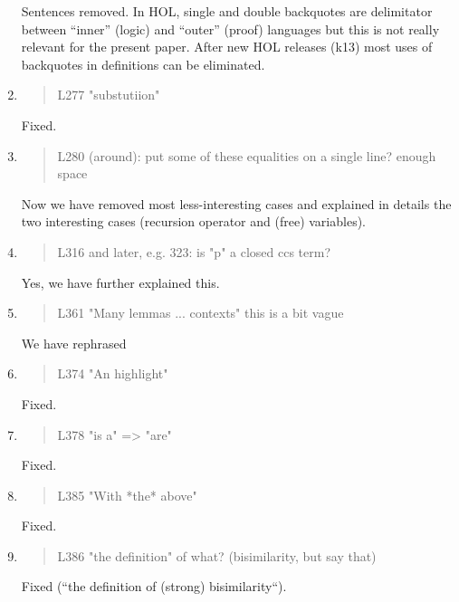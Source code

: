 \begin{enumerate}
  \Mark
  Sentences removed. In HOL, single and double backquotes are
  delimitator between ``inner'' (logic) and ``outer'' (proof)
  languages but this is not really  relevant for the present paper.
  After new HOL releases (k13) most uses of backquotes in  definitions can be eliminated.
  
\item \begin{quote}
    L277 "substutiion"
  \end{quote}
  \Mark
  Fixed.
  
\item \begin{quote}
    L280 (around): put some of these equalities on a single line? enough space
  \end{quote}
  \Mark
  Now we have removed most less-interesting cases and explained in
  details the two interesting cases (recursion operator and (free) variables).
  
\item \begin{quote}
    L316 and later, e.g. 323: is "p" a closed ccs term?
  \end{quote}

  \Mark
  Yes, we have further explained this.

\item \begin{quote}
    L361 "Many lemmas ... contexts" this is a bit vague
  \end{quote}

  \Mark
 We have rephrased
  
\item \begin{quote}
    L374 "An highlight"
  \end{quote}
   \Mark
 Fixed.  %
  
\item \begin{quote}
    L378 "is a" => "are"
  \end{quote}
  \Mark
  Fixed.  
  
\item \begin{quote}
    L385 "With *the* above"
  \end{quote}
  \Mark
  Fixed.
  
\item \begin{quote}
    L386 "the definition" of what? (bisimilarity, but say that)
  \end{quote}
  \Mark
  Fixed (``the definition of (strong) bisimilarity``).
  

\end{enumerate}

